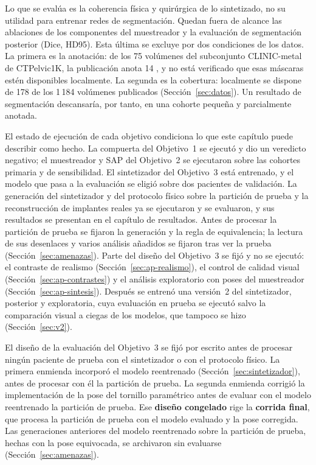 Lo que se evalúa es la coherencia física y quirúrgica de lo sintetizado, no su utilidad para entrenar redes de segmentación. Quedan fuera de alcance las ablaciones de los componentes del muestreador y la evaluación de segmentación posterior (Dice, HD95). Esta última se excluye por dos condiciones de los datos. La primera es la anotación: de los 75 volúmenes del subconjunto CLINIC-metal de CTPelvic1K, la publicación anota 14 \cite{liu2021ctpelvic1k}, y no está verificado que esas máscaras estén disponibles localmente. La segunda es la cobertura: localmente se dispone de 178 de los 1\,184 volúmenes publicados (Sección~\ref{sec:datos}). Un resultado de segmentación descansaría, por tanto, en una cohorte pequeña y parcialmente anotada.

El estado de ejecución de cada objetivo condiciona lo que este capítulo puede describir como hecho. La compuerta del Objetivo~1 se ejecutó y dio un veredicto negativo; el muestreador y SAP del Objetivo~2 se ejecutaron sobre las cohortes primaria y de sensibilidad. El sintetizador del Objetivo~3 está entrenado, y el modelo que pasa a la evaluación se eligió sobre dos pacientes de validación. La generación del sintetizador y del protocolo físico sobre la partición de prueba y la reconstrucción de implantes reales ya se ejecutaron y se evaluaron, y sus resultados se presentan en el capítulo de resultados. Antes de procesar la partición de prueba se fijaron la generación y la regla de equivalencia; la lectura de sus desenlaces y varios análisis añadidos se fijaron tras ver la prueba (Sección~\ref{sec:amenazas}). Parte del diseño del Objetivo~3 se fijó y no se ejecutó: el contraste de realismo (Sección~\ref{sec:ap-realismo}), el control de calidad visual (Sección~\ref{sec:ap-contrastes}) y el análisis exploratorio con poses del muestreador (Sección~\ref{sec:ap-sintesis}). Después se entrenó una versión~2 del sintetizador, posterior y exploratoria, cuya evaluación en prueba se ejecutó salvo la comparación visual a ciegas de los modelos, que tampoco se hizo (Sección~\ref{sec:v2}).

El diseño de la evaluación del Objetivo~3 se fijó por escrito antes de procesar ningún paciente de prueba con el sintetizador o con el protocolo físico. La primera enmienda incorporó el modelo reentrenado (Sección~\ref{sec:sintetizador}), antes de procesar con él la partición de prueba. La segunda enmienda corrigió la implementación de la pose del tornillo paramétrico antes de evaluar con el modelo reentrenado la partición de prueba. Ese \textbf{diseño congelado} rige la \textbf{corrida final}, que procesa la partición de prueba con el modelo evaluado y la pose corregida. Las generaciones anteriores del modelo reentrenado sobre la partición de prueba, hechas con la pose equivocada, se archivaron sin evaluarse (Sección~\ref{sec:amenazas}).

